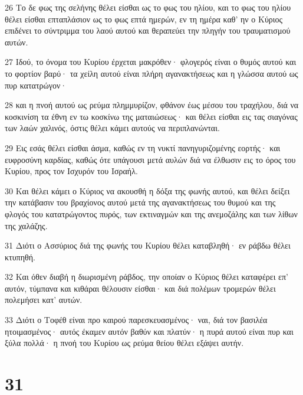 \par 26 Το δε φως της σελήνης θέλει είσθαι ως το φως του ηλίου, και το φως του ηλίου θέλει είσθαι επταπλάσιον ως το φως επτά ημερών, εν τη ημέρα καθ' ην ο Κύριος επιδένει το σύντριμμα του λαού αυτού και θεραπεύει την πληγήν του τραυματισμού αυτών.
\par 27 Ιδού, το όνομα του Κυρίου έρχεται μακρόθεν· φλογερός είναι ο θυμός αυτού και το φορτίον βαρύ· τα χείλη αυτού είναι πλήρη αγανακτήσεως και η γλώσσα αυτού ως πυρ κατατρώγον·
\par 28 και η πνοή αυτού ως ρεύμα πλημμυρίζον, φθάνον έως μέσου του τραχήλου, διά να κοσκινίση τα έθνη εν τω κοσκίνω της ματαιώσεως· και θέλει είσθαι εις τας σιαγόνας των λαών χαλινός, όστις θέλει κάμει αυτούς να περιπλανώνται.
\par 29 Εις εσάς θέλει είσθαι άσμα, καθώς εν τη νυκτί πανηγυριζομένης εορτής· και ευφροσύνη καρδίας, καθώς ότε υπάγουσι μετά αυλών διά να έλθωσιν εις το όρος του Κυρίου, προς τον Ισχυρόν του Ισραήλ.
\par 30 Και θέλει κάμει ο Κύριος να ακουσθή η δόξα της φωνής αυτού, και θέλει δείξει την κατάβασιν του βραχίονος αυτού μετά της αγανακτήσεως του θυμού και της φλογός του κατατρώγοντος πυρός, των εκτιναγμών και της ανεμοζάλης και των λίθων της χαλάζης.
\par 31 Διότι ο Ασσύριος διά της φωνής του Κυρίου θέλει καταβληθή· εν ράβδω θέλει κτυπηθή.
\par 32 Και όθεν διαβή η διωρισμένη ράβδος, την οποίαν ο Κύριος θέλει καταφέρει επ' αυτόν, τύμπανα και κιθάραι θέλουσιν είσθαι· και διά πολέμων τρομερών θέλει πολεμήσει κατ' αυτών.
\par 33 Διότι ο Τοφέθ είναι προ καιρού παρεσκευασμένος· ναι, διά τον βασιλέα ητοιμασμένος· αυτός έκαμεν αυτόν βαθύν και πλατύν· η πυρά αυτού είναι πυρ και ξύλα πολλά· η πνοή του Κυρίου ως ρεύμα θείου θέλει εξάψει αυτήν.

\chapter{31}

